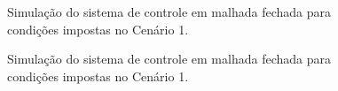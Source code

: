 \begin{figure}[!ht]
    \caption{Simulação do sistema de controle em malhada fechada para condições
    impostas no Cenário 1.}
    \vspace{-10pt}
    \hspace{-30pt}
    \label{fig:resultado-desafio2-questao6}
    \begin{minipage}{\linewidth}
        
    \end{minipage}
\end{figure}

\begin{figure}[!ht]
    \caption{Simulação do sistema de controle em malhada fechada para condições
    impostas no Cenário 1.}
    \vspace{-10pt}
    \hspace{-30pt}
    \label{fig:resultado-extra-desafio2-questao6}
    \begin{minipage}{\linewidth}
        
    \end{minipage}
\end{figure}